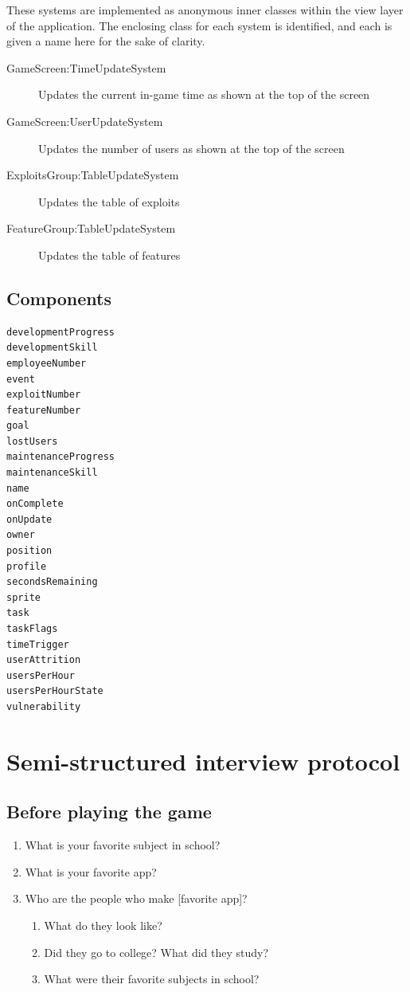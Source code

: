 \documentclass[letterpaper]{article}
\begin{document}
These systems are implemented as anonymous inner classes within the
view layer of the application.  The enclosing class for each system is
identified, and each is given a name here for the sake of clarity.

\begin{description}
\item[GameScreen:TimeUpdateSystem] Updates the current in-game time
 as shown at the top of the screen
\item[GameScreen:UserUpdateSystem] Updates the number of users as shown
 at the top of the screen
\item[ExploitsGroup:TableUpdateSystem] Updates the table of exploits
\item[FeatureGroup:TableUpdateSystem] Updates the table of features
\end{description}

\clearpage
\subsection*{Components}
\begin{multicols}{2}
\begin{verbatim}
developmentProgress
developmentSkill
employeeNumber
event
exploitNumber
featureNumber
goal
lostUsers
maintenanceProgress
maintenanceSkill
name
onComplete
onUpdate
owner
position
profile
secondsRemaining
sprite
task
taskFlags
timeTrigger
userAttrition
usersPerHour
usersPerHourState
vulnerability
\end{verbatim}
\end{multicols}

\clearpage
\section{Semi-structured interview protocol}
\label{appendix:interview-protocol}

\subsection*{Before playing the game}

\begin{enumerate}
\item What is your favorite subject in school?
\item What is your favorite app?
\item Who are the people who make [favorite app]?
\begin{enumerate}
\item What do they look like?
\item Did they go to college? What did they study?
\item What were their favorite subjects in school?
\end{enumerate}
\end{enumerate}
\end{document}
